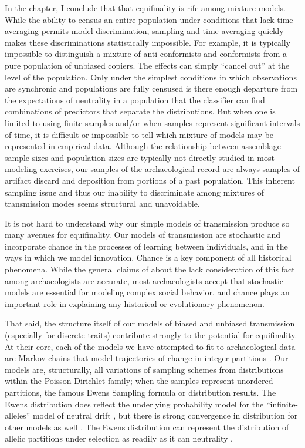 In the chapter, I conclude that that equifinality is rife among mixture models. While the ability to census an entire population under conditions that lack time averaging permits model discrimination, sampling and time averaging quickly makes these discriminations statistically impossible. For example, it is typically impossible to distinguish a mixture of anti-conformists and conformists from a pure population of unbiased copiers.  The effects can simply ``cancel out'' at the level of the population.  Only under the simplest conditions in which observations are synchronic and populations are fully censused is there enough departure from the expectations of neutrality in a population that the classifier can find combinations of predictors that separate the distributions. But when one is limited to using finite samples and/or when samples represent significant intervals of time, it is difficult or impossible to tell which mixture of models may be represented in empirical data. Although the relationship between assemblage sample sizes and population sizes are typically not directly studied in most modeling exercises, our samples of the archaeological record are always samples of artifact discard and deposition from portions of a past population. This inherent sampling issue  and thus our inability to discriminate among mixtures of transmission modes seems structural and unavoidable.

It is not hard to understand why our simple models of transmission produce so many avenues for equifinality.  Our models of transmission are stochastic and incorporate chance in the processes of learning between individuals, and in the ways in which we model innovation. Chance is a key component of all historical phenomena. While the general claims of \citet{billiard2018stochasticity} about the lack consideration of this fact among archaeologists are accurate, most archaeologists accept that stochastic models are essential for modeling complex social behavior, and chance plays an important role in explaining any historical or evolutionary phenomenon. 

That said, the structure itself of our models of biased and unbiased transmission (especially for discrete traits) contribute strongly to the potential for equifinality.  At their core, each of the models we have attempted to fit to archaeological data are Markov chains that model trajectories of change in integer partitions \citep{crane2016ubiquitous}.  Our models are, structurally, all variations of sampling schemes from distributions within the Poisson-Dirichlet family; when the samples represent unordered partitions, the famous Ewens Sampling formula or distribution results.  The Ewens distribution does reflect the underlying probability model for the ``infinite-alleles'' model of neutral drift \citep{ewens1972sampling}, but there is strong convergence in distribution for other models as well \citep{huillet2007ewens}.  The Ewens distribution can represent the distribution of allelic partitions under selection as readily as it can neutrality \citep{gillespie1977sampling,grote2002approximate,khromov2018,sawyer1985sampling}.  

